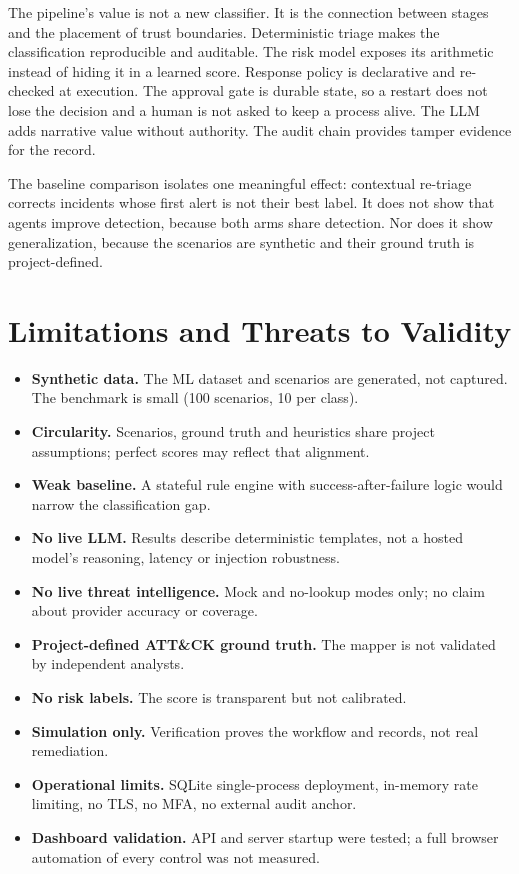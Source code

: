 \documentclass[10pt,twocolumn]{article}
\begin{document}
The pipeline's value is not a new classifier. It is the connection between stages and the placement of trust boundaries. Deterministic triage makes the classification reproducible and auditable. The risk model exposes its arithmetic instead of hiding it in a learned score. Response policy is declarative and re-checked at execution. The approval gate is durable state, so a restart does not lose the decision and a human is not asked to keep a process alive. The LLM adds narrative value without authority. The audit chain provides tamper evidence for the record.

The baseline comparison isolates one meaningful effect: contextual re-triage corrects incidents whose first alert is not their best label. It does not show that agents improve detection, because both arms share detection. Nor does it show generalization, because the scenarios are synthetic and their ground truth is project-defined.

\section{Limitations and Threats to Validity}

\begin{itemize}
  \item \textbf{Synthetic data.} The ML dataset and scenarios are generated, not captured. The benchmark is small (100 scenarios, 10 per class).
  \item \textbf{Circularity.} Scenarios, ground truth and heuristics share project assumptions; perfect scores may reflect that alignment.
  \item \textbf{Weak baseline.} A stateful rule engine with success-after-failure logic would narrow the classification gap.
  \item \textbf{No live LLM.} Results describe deterministic templates, not a hosted model's reasoning, latency or injection robustness.
  \item \textbf{No live threat intelligence.} Mock and no-lookup modes only; no claim about provider accuracy or coverage.
  \item \textbf{Project-defined ATT\&CK ground truth.} The mapper is not validated by independent analysts.
  \item \textbf{No risk labels.} The score is transparent but not calibrated.
  \item \textbf{Simulation only.} Verification proves the workflow and records, not real remediation.
  \item \textbf{Operational limits.} SQLite single-process deployment, in-memory rate limiting, no TLS, no MFA, no external audit anchor.
  \item \textbf{Dashboard validation.} API and server startup were tested; a full browser automation of every control was not measured.
\end{itemize}
\end{document}
